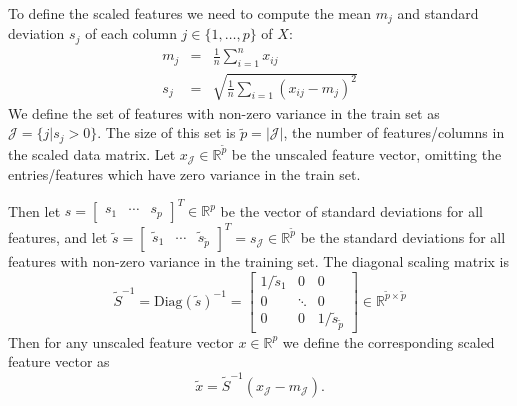 \documentclass{article}
\begin{document}
To define the scaled features we need to compute the mean $m_j$ and
standard deviation $s_j$ of each column $j\in\{1,\dots, p\}$ of $X$:
\begin{eqnarray*}
  m_j &=& \frac 1 n \sum_{i=1}^n x_{ij}\\
  s_j &=& \sqrt{\frac 1 n \sum_{i=1} (x_{ij} - m_j)^2}
\end{eqnarray*}
We define the set of features with non-zero variance in the train set as
$\mathcal J = \{j|s_j>0\}$. The size of this set is
$\tilde p = |\mathcal J|$, the number of features/columns in the
scaled data matrix. Let $x_{\mathcal J}\in\mathbb R^{\tilde p}$ be the
unscaled feature vector, omitting the entries/features which have zero
variance in the train set.

Then let $s =\left[
\begin{array}{ccc}
  s_1&\cdots & s_p
\end{array}
\right]^T\in\mathbb R^p$ be the vector of standard deviations for all
features, and let $\tilde s =\left[
\begin{array}{ccc}
  \tilde s_1&\cdots & \tilde s_{\tilde p}
\end{array}
\right]^T = s_{\mathcal J}\in\mathbb R^{\tilde p}$ be the standard
deviations for all features with non-zero variance in the training
set. The diagonal scaling matrix is
\begin{equation}
  \tilde S^{-1} = \text{Diag}(\tilde s)^{-1}=\left[
    \begin{array}{ccc}
      1/\tilde s_1& 0&0\\
      0 & \ddots & 0\\
      0 & 0 & 1/\tilde s_{\tilde p}
    \end{array}
\right]\in\mathbb R^{\tilde p\times \tilde p}
\end{equation}
Then for any unscaled feature vector $x\in \mathbb R^p$ we define the
corresponding scaled feature vector as 
\begin{equation}
  \label{eq:scaled-feature}
  \tilde x = \tilde S^{-1} (x_{\mathcal J} - m_{\mathcal J}).
\end{equation}
\end{document}
